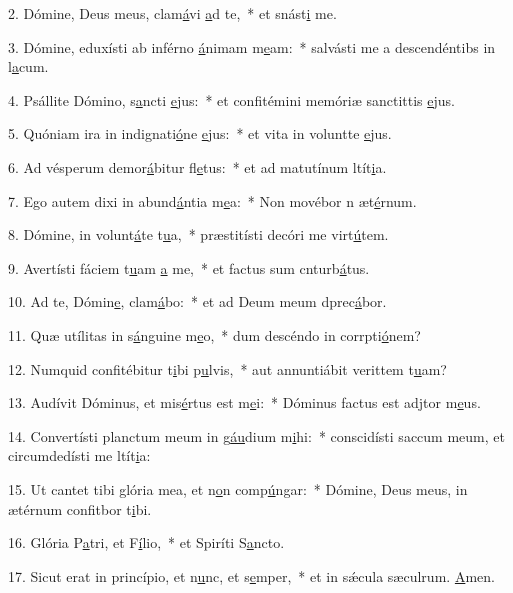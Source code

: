 2. Dómine, Deus meus, clam\uline{á}vi \uline{a}d te,~* et snást\uline{i} me.\par 
3. Dómine, eduxísti ab inférno \uline{á}nimam m\uline{e}am:~* salvásti me a descendéntibs in l\uline{a}cum.\par 
4. Psállite Dómino, s\uline{a}ncti \uline{e}jus:~* et confitémini memóriæ sanctittis \uline{e}jus.\par 
5. Quóniam ira in indignati\uline{ó}ne \uline{e}jus:~* et vita in voluntte \uline{e}jus.\par 
6. Ad vésperum demor\uline{á}bitur fl\uline{e}tus:~* et ad matutínum ltít\uline{i}a.\par 
7. Ego autem dixi in abund\uline{á}ntia m\uline{e}a:~* Non movébor n æt\uline{é}rnum.\par 
8. Dómine, in volunt\uline{á}te t\uline{u}a,~* præstitísti decóri me virt\uline{ú}tem.\par 
9. Avertísti fáciem t\uline{u}am \uline{a} me,~* et factus sum cnturb\uline{á}tus.\par 
10. Ad te, Dómin\uline{e}, clam\uline{á}bo:~* et ad Deum meum dprec\uline{á}bor.\par 
11. Quæ utílitas in s\uline{á}nguine m\uline{e}o,~* dum descéndo in corrpti\uline{ó}nem?\par 
12. Numquid confitébitur t\uline{i}bi p\uline{u}lvis,~* aut annuntiábit verittem t\uline{u}am?\par 
13. Audívit Dóminus, et mis\uline{é}rtus est m\uline{e}i:~* Dóminus factus est adjtor m\uline{e}us.\par 
14. Convertísti planctum meum in g\uline{áu}dium m\uline{i}hi:~* conscidísti saccum meum, et circumdedísti me ltít\uline{i}a:\par 
15. Ut cantet tibi glória mea, et n\uline{o}n comp\uline{ú}ngar:~* Dómine, Deus meus, in ætérnum confitbor t\uline{i}bi.\par 
16. Glória P\uline{a}tri, et F\uline{í}lio,~* et Spiríti S\uline{a}ncto.\par 
17. Sicut erat in princípio, et n\uline{u}nc, et s\uline{e}mper,~* et in sǽcula sæculrum. \uline{A}men.\par 
